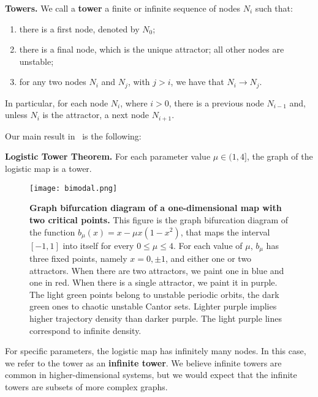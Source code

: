 \documentclass{article}
\def\edge{\to}
\newcommand{\jim}{\color{black} }
\begin{document}

{\bf Towers.} We call a {\bf tower} a finite or infinite sequence of nodes $N_i$ such that: 
\begin{enumerate}
    \item there is a first node, denoted by $N_0$;
    \item there is a final node, which is the unique attractor; all other nodes are unstable;
    \item for any two nodes $N_i$ and $N_j$, with $j>i$, we have that {$N_i\edge N_j$}.
\end{enumerate}
In particular, for each node $N_i$, where $i>0$, there is a previous node $N_{i-1}$ and, unless $N_i$ is the attractor, a next node $N_{i+1}$.

Our main result in~\cite{DLY20} is the following:

\smallskip
{\bf Logistic Tower Theorem.} 
{\jim For each parameter value $\mu\in(1,4]$, the graph of the logistic map is a tower.}
\smallskip

\begin{figure}
 \centering
 \texttt{[image: bimodal.png]}
 \caption{{\bf\jim Graph bifurcation diagram of a one-dimensional map with two critical points.}
 \jim This figure is the graph bifurcation diagram of the function $b_\mu(x)=x-\mu x(1-x^2)$, that maps the interval $[-1,1]$ into itself for every $0\leq\mu\leq4$. %
 For each value of $\mu$, $b_\mu$ has three fixed points, namely $x=0,\pm1$, and either one or two attractors. When there are two attractors, we paint one in blue and one in red. When there is a single attractor, we paint it in purple. The light green points belong to unstable periodic orbits, the dark green ones to chaotic unstable Cantor sets. 
 Lighter purple implies higher trajectory density than darker purple.
 The light purple lines correspond to infinite density.
}
 \label{fig:S-bimodal}
\end{figure} 

For specific parameters, the logistic map has infinitely many nodes.
In this case, we refer to the tower as an {\bf infinite tower}. 
{\jim 
We believe infinite towers are common in higher-dimensional systems, but we would expect that the infinite towers are subsets of more complex graphs.
}
\end{document}
